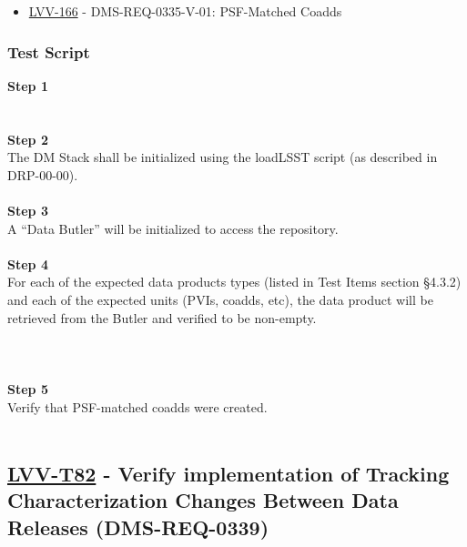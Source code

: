 \begin{itemize}
\tightlist
\item
  \href{https://jira.lsstcorp.org/browse/LVV-166}{LVV-166} -
  DMS-REQ-0335-V-01: PSF-Matched Coadds
\end{itemize}

\hypertarget{test-script-34}{%
\subsubsection{Test Script}\label{test-script-34}}

\textbf{Step 1}\\
~\\
~\\
\textbf{Step 2}\\
The DM Stack shall be initialized using the loadLSST script (as
described in DRP-00-00).\\
~\\
\textbf{Step 3}\\
A ``Data Butler'' will be initialized to access the repository.\\
~\\
\textbf{Step 4}\\
For each of the expected data products types (listed in Test Items
section §4.3.2) and each of the expected units (PVIs, coadds, etc), the
data product will be retrieved from the Butler and verified to be
non-empty.\\
~\\
~\\
~\\
\textbf{Step 5}\\
Verify that PSF-matched coadds were created.\\
~\\

\hypertarget{lvv-t82---verify-implementation-of-tracking-characterization-changes-between-data-releases-dms-req-0339}{%
\subsection{\texorpdfstring{\href{https://jira.lsstcorp.org/secure/Tests.jspa\#/testCase/LVV-T82}{LVV-T82}
- Verify implementation of Tracking Characterization Changes Between
Data Releases
(DMS-REQ-0339)}{LVV-T82 - Verify implementation of Tracking Characterization Changes Between Data Releases (DMS-REQ-0339)}}\label{lvv-t82---verify-implementation-of-tracking-characterization-changes-between-data-releases-dms-req-0339}}

